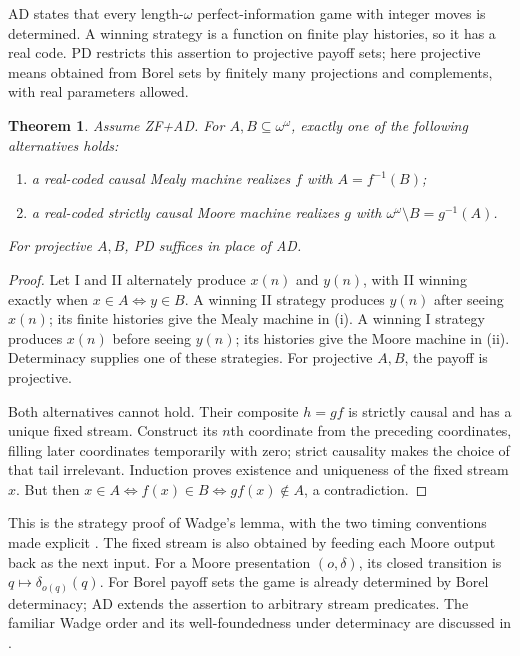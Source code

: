 \documentclass[11pt]{article}
\newtheorem{theorem}{Theorem}[section]
\theoremstyle{definition}
\newcommand{\B}{\omega^\omega}
\begin{document}
AD states that every length-$\omega$ perfect-information game with
integer moves is determined. A winning strategy is a function on
finite play histories, so it has a real code. PD restricts this
assertion to projective payoff sets; here projective means obtained
from Borel sets by finitely many projections and complements, with
real parameters allowed.

\begin{theorem}\label{thm:mealy-moore}
Assume ZF+AD. For $A,B\subseteq\B$, exactly one of the
following alternatives holds:
\begin{enumerate}[label=(\roman*),nosep]
\item a real-coded causal Mealy machine realizes $f$ with
      $A=f^{-1}(B)$;
\item a real-coded strictly causal Moore machine realizes $g$ with
      $\B\setminus B=g^{-1}(A)$.
\end{enumerate}
For projective $A,B$, PD suffices in place of AD.
\end{theorem}
\begin{proof}
Let I and II alternately produce $x(n)$ and $y(n)$, with II
winning exactly when $x\in A\iff y\in B$. A winning II
strategy produces $y(n)$ after seeing $x(n)$; its finite histories
give the Mealy machine in (i). A winning I strategy produces
$x(n)$ before seeing $y(n)$; its histories give the Moore machine
in (ii). Determinacy supplies one of these strategies. For
projective $A,B$, the payoff is projective.

Both alternatives cannot hold. Their composite $h=gf$ is strictly
causal and has a unique fixed stream. Construct its $n$th coordinate
from the preceding coordinates, filling later coordinates temporarily
with zero; strict causality makes the choice of that tail irrelevant.
Induction proves existence and uniqueness of the fixed stream $x$.
But then
$x\in A\iff f(x)\in B\iff gf(x)\notin A$, a contradiction.
\end{proof}

This is the strategy proof of Wadge's lemma, with the two timing
conventions made explicit \cite[Theorem 7D.3]{Moschovakis}.
The fixed stream is also obtained by feeding each Moore output back
as the next input. For a Moore presentation $(o,\delta)$, its
closed transition is $q\mapsto\delta_{o(q)}(q)$.
For Borel payoff sets the game is already determined by Borel
determinacy; AD extends the assertion to arbitrary stream predicates.
The familiar Wadge order and its well-foundedness under determinacy
are discussed in \cite{Carroy}.
\end{document}
